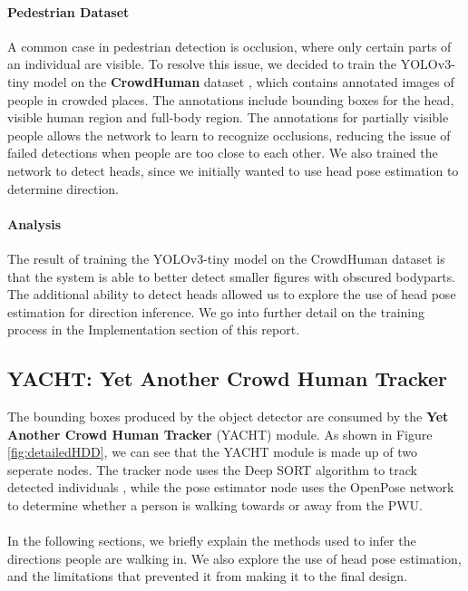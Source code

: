\paragraph{Pedestrian Dataset} A common case in pedestrian detection is occlusion, where only certain parts of an individual are visible.  To resolve this issue, we decided to train the YOLOv3-tiny model on the \textbf{CrowdHuman} dataset \cite{Shao}, which contains annotated images of people in crowded places. The annotations include bounding boxes for the head, visible human region and full-body region. The annotations for partially visible people allows the network to learn to recognize occlusions, reducing the issue of failed detections when people are too close to each other. We also trained the network to detect heads, since we initially wanted to use head pose estimation to determine direction.

\paragraph{Analysis}
The result of training the YOLOv3-tiny model on the CrowdHuman dataset is that the system is able to better detect smaller figures with obscured bodyparts. The additional ability to detect heads allowed us to explore the use of head pose estimation for direction inference. We go into further detail on the training process in the Implementation section of this report.

\newpage

\subsection{YACHT: Yet Another Crowd Human Tracker}
The bounding boxes produced by the object detector are consumed by the \textbf{Yet Another Crowd Human Tracker} (YACHT) module. As shown in Figure \ref{fig:detailedHDD}, we can see that the YACHT module is made up of two seperate nodes. The tracker node uses the Deep SORT algorithm to track detected individuals \cite{Wojke2018}, while the pose estimator node uses the OpenPose \cite{Cao2017} network to determine whether a person is walking towards or away from the PWU.

\paragraph{}In the following sections, we briefly explain the  methods used to infer the directions people are walking in. We also explore the use of head pose estimation, and the limitations that prevented it from making it to the final design.

